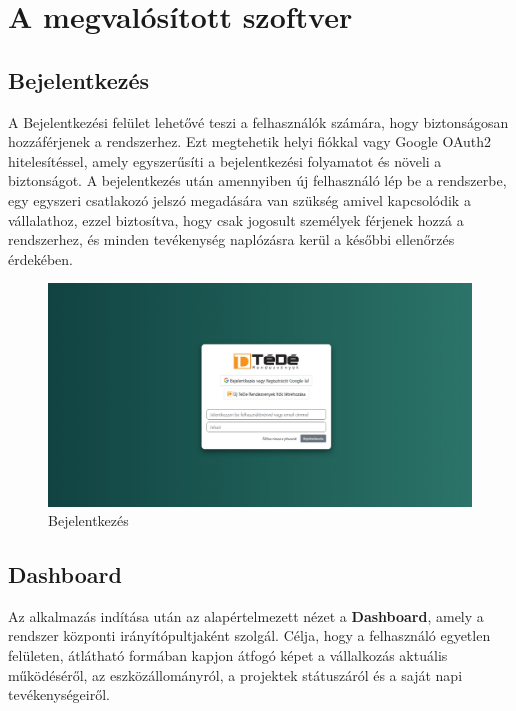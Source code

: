 \section{A megvalósított szoftver}
\subsection{Bejelentkezés}
A Bejelentkezési felület lehetővé teszi a felhasználók számára, hogy biztonságosan hozzáférjenek a rendszerhez.
Ezt megtehetik helyi fiókkal vagy Google OAuth2 hitelesítéssel, amely egyszerűsíti a bejelentkezési folyamatot és növeli a biztonságot.
A bejelentkezés után amennyiben új felhasználó lép be a rendszerbe, egy egyszeri csatlakozó jelszó megadására van szükség amivel kapcsolódik a vállalathoz,
ezzel biztosítva, hogy csak jogosult személyek férjenek hozzá a rendszerhez, és minden tevékenység naplózásra kerül a későbbi ellenőrzés érdekében.
\begin{figure}[H]
	\centering
    \includegraphics[width=150mm, keepaspectratio]{figures/login.jpg}
    \caption{Bejelentkezés}
    \label{fig:login}
\end{figure}
\subsection{Dashboard}

Az alkalmazás indítása után az alapértelmezett nézet a \textbf{Dashboard}, amely a rendszer központi irányítópultjaként szolgál.  
Célja, hogy a felhasználó egyetlen felületen, átlátható formában kapjon átfogó képet a vállalkozás aktuális működéséről, 
az eszközállományról, a projektek státuszáról és a saját napi tevékenységeiről.

